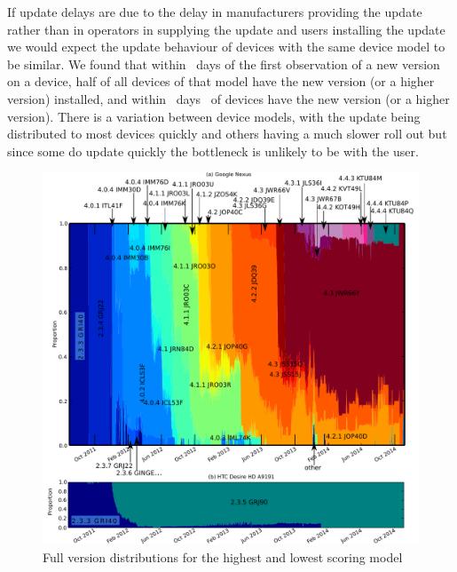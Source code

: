 If update delays are due to the delay in manufacturers providing the update rather than in operators in supplying the update and users installing the update we would expect the update behaviour of devices with the same device model to be similar.
We found that within \daModelHalfDeployment\ days of the first observation of a new version on a device, half of all devices of that model have the new version (or a higher version) installed, and within \daModelFullDeployment\ days \daFullDeployedAt\ of devices have the new version (or a higher version).
There is a variation between device models, with the update being distributed to most devices quickly and others having a much slower roll out but since some do update quickly the bottleneck is unlikely to be with the user.

\begin{figure}
 \centering
 \includegraphics[width=\textwidth]{figures/full_version_comp.pdf}
 \caption{Full version distributions for the highest and lowest scoring model}
 \label{fig:full_version_comp}
\end{figure}

